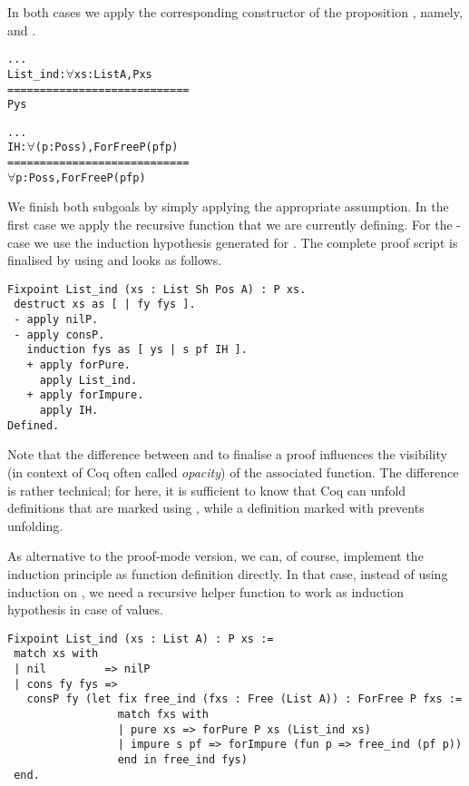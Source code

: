 In both cases we apply the corresponding constructor of the proposition , namely,  and .

\begin{alltt}
  ...
  List_ind : \(\forall\) xs : List A, P xs
  ============================
  P ys

  ...
  IH : \(\forall\) (p : Pos s), ForFree P (pf p)
  ============================
  \(\forall\) p : Pos s, ForFree P (pf p)
\end{alltt}

We finish both subgoals by simply applying the appropriate assumption.
In the first case we apply the recursive function  that we are currently defining.
For the \--case we use the induction hypothesis generated for .
The complete proof script is finalised by using  and looks as follows.

\begin{verbatim}
Fixpoint List_ind (xs : List Sh Pos A) : P xs.
 destruct xs as [ | fy fys ].
 - apply nilP.
 - apply consP.
   induction fys as [ ys | s pf IH ].
   + apply forPure.
     apply List_ind.
   + apply forImpure.
     apply IH.
Defined.
\end{verbatim}

Note that the difference between  and  to finalise a proof influences the visibility (in context of Coq often called \emph{opacity}) of the associated function.
The difference is rather technical; for here, it is sufficient to know that Coq can unfold definitions that are marked using , while a definition marked with  prevents unfolding.

As alternative to the proof\--mode version, we can, of course, implement the induction principle as function definition directly.
In that case, instead of using induction on , we need a recursive helper function  to work as induction hypothesis in case of  values.

\begin{verbatim}
Fixpoint List_ind (xs : List A) : P xs :=
 match xs with
 | nil         => nilP
 | cons fy fys =>
   consP fy (let fix free_ind (fxs : Free (List A)) : ForFree P fxs :=
                 match fxs with
                 | pure xs => forPure P xs (List_ind xs)
                 | impure s pf => forImpure (fun p => free_ind (pf p))
                 end in free_ind fys)
 end.
\end{verbatim}

